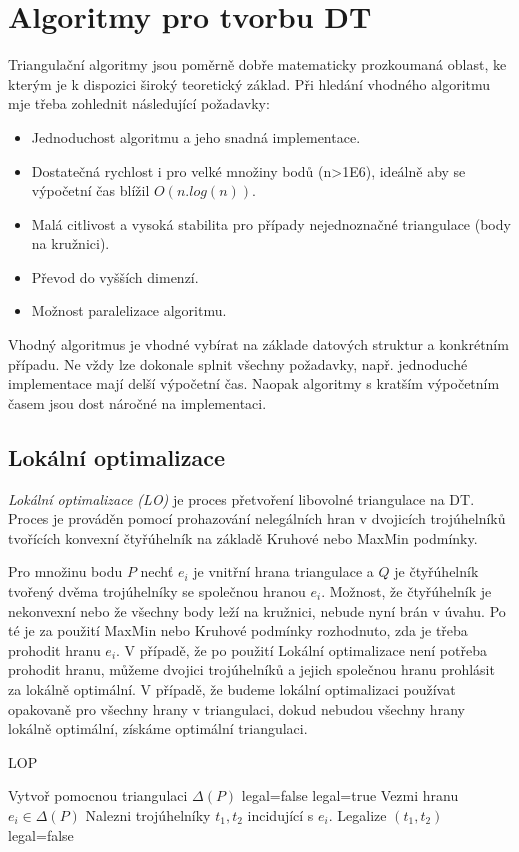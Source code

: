 \documentclass[12pt,a4paper]{article}
\begin{document}
\section{Algoritmy pro tvorbu DT}
\label{sec:algoritmy}
Triangulační algoritmy jsou poměrně dobře matematicky prozkoumaná oblast, ke kterým je k dispozici široký teoretický základ. Při hledání vhodného algoritmu mje třeba zohlednit následující požadavky:
\begin{itemize}
\item Jednoduchost algoritmu a jeho snadná implementace.
\item Dostatečná rychlost i pro velké množiny bodů (n>1E6), ideálně aby se výpočetní čas blížil $O(n . log(n))$.
\item Malá citlivost a vysoká stabilita pro případy nejednoznačné triangulace (body na kružnici).
\item Převod do vyšších dimenzí.
\item Možnost paralelizace algoritmu.
\end{itemize}
Vhodný algoritmus je vhodné vybírat na základe datových struktur a konkrétním případu. Ne vždy lze dokonale splnit všechny požadavky, např. jednoduché implementace mají delší výpočetní čas. Naopak algoritmy s kratším výpočetním časem jsou dost náročné na implementaci.

\newpage
\subsection{Lokální optimalizace}
\emph{Lokální optimalizace (LO)} je proces přetvoření libovolné triangulace na DT. Proces je prováděn pomocí prohazování nelegálních hran v dvojicích trojúhelníků tvořících konvexní čtyřúhelník na základě Kruhové nebo MaxMin podmínky.

Pro množinu bodu $P$ nechť $e_i$ je vnitřní hrana triangulace a $Q$ je čtyřúhelník tvořený dvěma trojúhelníky se společnou hranou $e_i$. Možnost, že čtyřúhelník je nekonvexní nebo že všechny body leží na kružnici, nebude nyní brán v úvahu. Po té je za použití MaxMin nebo Kruhové podmínky rozhodnuto, zda je třeba prohodit hranu $e_i$. V případě, že po použití Lokální optimalizace není potřeba prohodit hranu, můžeme dvojici trojúhelníků a jejich společnou hranu prohlásit za lokálně optimální. V případě, že  budeme lokální optimalizaci používat opakovaně pro všechny hrany v triangulaci, dokud nebudou všechny hrany lokálně optimální, získáme optimální triangulaci.

\begin{algorithm}
\caption{LOP}
\begin{algorithmic}[1]
\State Vytvoř pomocnou triangulaci $\Delta(P)$
\State legal=false
	\State legal=true
		\State Vezmi hranu $e_i \in \Delta(P)$
		\State Nalezni trojúhelníky $t_1,t_2$ incidující s $e_i$.
			\State Legalize $(t_1,t_2)$
			\State legal=false
		\EndIf
	\EndFor
\EndWhile	
\end{algorithmic}
\end{algorithm}
\end{document}
